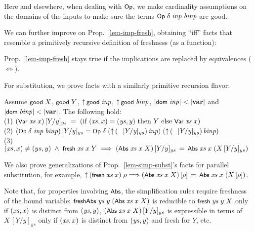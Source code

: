 \documentclass{llncs}
\begin{document}
Here and elsewhere, when dealing with $\Op$, we make cardinality 
assumptions on the domains of the inputs to make sure the  
terms $\Op\;\delta\;\inp\;\binp$ are good. 

We can further improve on Prop.~\ref{lem-imp-fresh}, obtaining ``iff'' facts that resemble a primitively recursive 
definition of freshness (as a function): 

\begin{prop}\label{lem-simp-fresh}\rm
Prop.~\ref{lem-imp-fresh} stays true if the implications %
are replaced by equivalences ($\!\iff\!$). 
\end{prop}

For substitution, we prove facts with a similarly primitive recursion flavor:

\begin{prop}\label{lem-simp-subst}\rm
Assume $\good\;X$, $\good\;Y$, $\lift\,\good\;\inp$, $\lift\,\good\;\binp$, 
$|\dom\;\inp| < |\var|$ and $|\dom\;\binp| \allowbreak< |\var|$. 
The following hold:
%
\\(1) $(\Var\;\xs\;x)\,[Y/y]_{ys} \;=\; (\mbox{if $(\xs,x) = (\ys,y)$ then $Y$ else $\Var\;\xs\;x$})$ 
%
\\(2) $(\Op\;\delta\;\inp\;\binp)\,[Y/y]_{ys} = 
\Op\;\delta\;(\lift\,(\_[Y/y]_{ys})\,\inp)\;(\lift\,(\_[Y/y]_{ys})\,\binp)$ 
%
%
\\(3) $(\xs,x) \not= (ys,y) \;\wedge\; \fresh\;\xs\;x\;Y
\;\Lra\; 
(\Abs\;\xs\;x\;X)\,[Y/y]_{ys} \,=\, \Abs\;\xs\;x\;(X\,[Y/y]_{ys})
$
\end{prop}
 
We also prove generalizations of Prop.\ \ref{lem-simp-subst}'s facts for parallel substitution, for example, 
%
$
\lift\,(\fresh\;\xs\;x)\;\rho \allowbreak \Lra 
(\Abs\;\xs\;x\;X)\,[\rho] \,=\, \Abs\;\xs\;x\;(X\,[\rho])
$. 
%


Note that, for properties involving $\Abs$, the simplification rules %
require 
freshness of the bound variable: 
$\freshAbs\;\ys\;y\;(\Abs\;\xs\;x\;X)$ is reducible to $\fresh\;\ys\;y\;X$ 
only if $(\xs,x)$ is distinct from $(\ys,y)$, 
$(\Abs\;\xs\;x\;X)\,[Y/y]_{ys}$ is expressible in terms of $X\,[Y/y]_{ys}$ 
only if $(\xs,x)$ is distinct from $(\ys,y)$ and fresh for $Y$, etc. 
\end{document}
